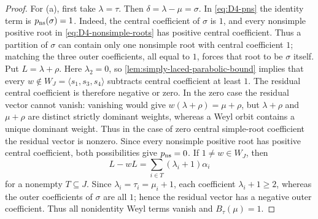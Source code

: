 \documentclass[11pt]{article}
\theoremstyle{definition}
\theoremstyle{remark}
\begin{document}
\begin{proof}
For (a), first take $\lambda=\tau$.  Then
$\delta=\lambda-\mu=\sigma$.  In \eqref{eq:D4-pns} the identity term is
$p_{\rm ns}(\sigma)=1$.  Indeed, the central coefficient of $\sigma$ is $1$,
and every nonsimple positive root in \eqref{eq:D4-nonsimple-roots} has
positive central coefficient.  Thus a partition of $\sigma$ can contain only
one nonsimple root with central coefficient $1$; matching the three outer
coefficients, all equal to $1$, forces that root to be $\sigma$ itself.  Put $L=\lambda+\rho$.  Here $\lambda_2=0$, so
\cref{lem:simply-laced-parabolic-bound} implies that every
$w\notin W_J=\langle s_1,s_3,s_4\rangle$ subtracts central coefficient at
least $1$.  The residual central coefficient is therefore negative or zero.  In the
zero case the residual vector cannot vanish: vanishing would give
$w(\lambda+\rho)=\mu+\rho$, but $\lambda+\rho$ and $\mu+\rho$ are distinct
strictly dominant weights, whereas a Weyl orbit contains a unique dominant
weight.  Thus in the case of zero central simple-root coefficient the residual vector is
nonzero.  Since every nonsimple positive root has positive central
coefficient, both possibilities give $p_{\rm ns}=0$.  If $1\ne w\in W_J$, then
\[
 L-wL=\sum_{i\in T}(\lambda_i+1)\alpha_i
\]
for a nonempty $T\subseteq J$.  Since
$\lambda_i=\tau_i=\mu_i+1$, each coefficient $\lambda_i+1\ge2$, whereas the
outer coefficients of $\sigma$ are all $1$; hence the residual vector has a
negative outer coefficient.  Thus all nonidentity Weyl terms vanish and
$B_\tau(\mu)=1$.


\end{proof}
\end{document}
